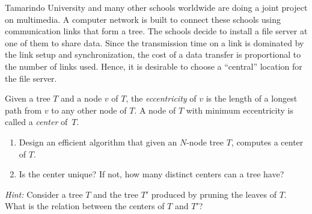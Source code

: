 Tamarindo University and many other schools worldwide are doing a joint
project on multimedia. A computer network is built to connect
these schools using communication links that form a tree.  The schools
decide to install a file server at one of them to share data.  Since
the transmission time on a link is dominated by the link setup and
synchronization, the cost of a data transfer is proportional to the
number of links used.  Hence, it is desirable to choose a ``central''
location for the file server.

Given a tree $T$ and a node $v$ of $T$, the {\em eccentricity} of $v$
is the length of a longest path from $v$ to any other node of
$T$.  A node of $T$ with minimum eccentricity is called a {\em center}
of~$T$.

\begin{enumerate}

\item  Design an efficient algorithm that given an $N$-node tree $T$,
computes a center of $T$.

\item  Is the center unique?  If not, how many distinct centers can a
tree have?

\end{enumerate}
{\it Hint:}
Consider a tree $T$ and the tree $T'$ produced by pruning the leaves
of $T$. What is the relation between the centers of $T$ and $T'$?
